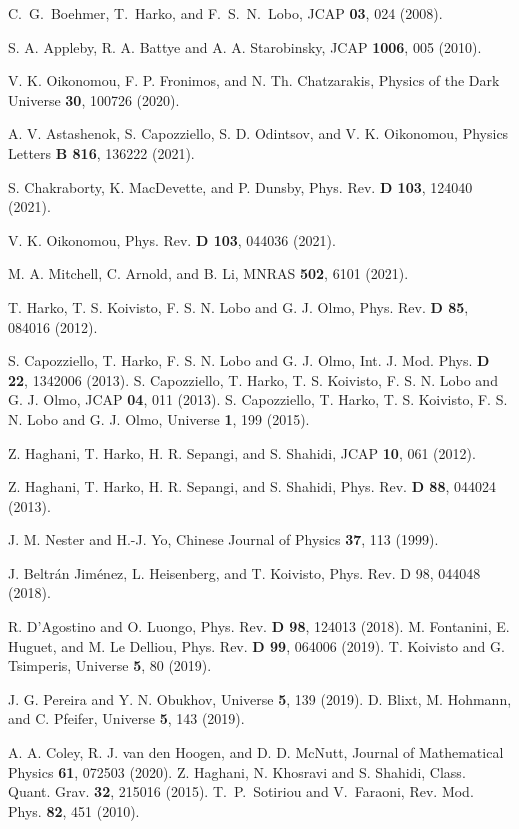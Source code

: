 \documentclass[aps,superscriptaddress, showpacs,preprintnumbers, superscriptaddress, nofootinbibt,twocolumn]{revtex4}
\begin{document}
\begin{thebibliography}{99}
 C.~G.~Boehmer, T.~Harko, and F.~S.~N.~Lobo, JCAP
\textbf{03}, 024 (2008).

  S. A. Appleby, R. A. Battye and A. A. Starobinsky, JCAP {\bf 1006}, 005 (2010).

 V. K. Oikonomou, F. P. Fronimos, and N. Th. Chatzarakis,
Physics of the Dark Universe {\bf 30},  100726 (2020).

 A. V. Astashenok, S. Capozziello, S. D. Odintsov, and V. K. Oikonomou, Physics Letters {\bf B 816},  136222 (2021).

 S. Chakraborty, K. MacDevette, and P. Dunsby, 	Phys. Rev. {\bf D 103}, 124040 (2021).

 V. K. Oikonomou, Phys. Rev. {\bf D 103}, 044036 (2021).

 M. A. Mitchell, C. Arnold, and B. Li, MNRAS {\bf 502}, 6101 (2021).

  T. Harko, T. S. Koivisto, F. S. N. Lobo and G. J. Olmo,  Phys. Rev. {\bf D 85},  084016 (2012).

  S. Capozziello, T. Harko, F. S. N. Lobo and G. J. Olmo, Int. J. Mod. Phys. {\bf D 22}, 1342006  (2013).
  S. Capozziello, T. Harko, T. S. Koivisto, F. S. N. Lobo and G. J. Olmo,  JCAP {\bf 04},  011 (2013).
  S. Capozziello, T. Harko, T. S. Koivisto, F. S. N. Lobo and G. J. Olmo,  Universe {\bf 1}, 199 (2015).

 Z. Haghani, T. Harko, H. R. Sepangi, and S. Shahidi, JCAP {\bf 10},  061 (2012).

 Z. Haghani, T. Harko, H. R. Sepangi, and S. Shahidi, Phys. Rev. {\bf D 88}, 044024 (2013).

  J. M. Nester and H.-J. Yo, Chinese Journal of Physics
{\bf 37}, 113 (1999).

 J. Beltr\'{a}n Jim\'{e}nez, L. Heisenberg, and T. Koivisto,
Phys. Rev. D 98, 044048 (2018).

 R. D’Agostino and O. Luongo, Phys. Rev. {\bf D 98}, 124013
(2018).
  M. Fontanini, E. Huguet, and M. Le Delliou, Phys. Rev.
{\bf D 99}, 064006 (2019).
 T. Koivisto and G. Tsimperis, Universe {\bf 5}, 80 (2019).

  J. G. Pereira and Y. N. Obukhov, Universe {\bf 5}, 139
(2019).
  D. Blixt, M. Hohmann, and C. Pfeifer, Universe {\bf 5}, 143
(2019).

 A. A. Coley, R. J. van den Hoogen, and D. D. McNutt,
Journal of Mathematical Physics {\bf 61}, 072503 (2020).
 Z. Haghani, N. Khosravi and S. Shahidi, Class. Quant. Grav. {\bf 32}, 215016 (2015).
 T.~P.~Sotiriou and V.~Faraoni, Rev. Mod. Phys. \textbf{82},
451 (2010).


\end{thebibliography}
\end{document}
